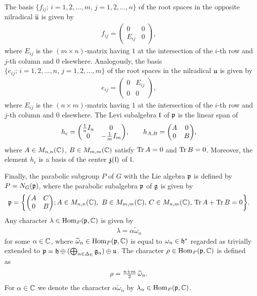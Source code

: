 The basis $\{f_{ij};\, i=1,2,\dots,m,\, j=1,2,\dots,n\}$ of the root spaces in the opposite nilradical $\overline{\mathfrak{u}}$ is given by
\begin{align}
  f_{ij} = \begin{pmatrix}
    0 & 0 \\
    E_{ij} & 0
  \end{pmatrix}\!,
\end{align}
where $E_{ij}$ is the $(m \times n)$-matrix having $1$ at the intersection of the $i$-th row and $j$-th column and $0$ elsewhere. Analogously, the basis $\{e_{ij};\, i=1,2,\dots,n,\, j=1,2,\dots,m\}$ of the root spaces in the nilradical $\mathfrak{u}$ is given by
\begin{align}
  e_{ij} = \begin{pmatrix}
    0 & E_{ij} \\
    0 & 0
  \end{pmatrix}\!,
\end{align}
where $E_{ij}$ is the $(n \times m)$-matrix having $1$ at the intersection of the $i$-th row and $j$-th column and $0$ elsewhere. The Levi subalgebra $\mathfrak{l}$ of $\mathfrak{p}$ is the linear span of
\begin{align}
  h_c = \begin{pmatrix}
    {1 \over n} I_n & 0 \\
    0 & -{1 \over m} I_m
  \end{pmatrix}\!, \qquad
  h_{A,B} = \begin{pmatrix}
    A & 0 \\
    0 & B
  \end{pmatrix}\!,
\end{align}
where $A \in M_{n,n}(\mathbb{C})$, $B \in M_{m,m}(\mathbb{C})$ satisfy $\operatorname{\mathrm{Tr}} A=0$ and $\operatorname{\mathrm{Tr}} B=0$. Moreover,
the element $h_c$ is a basis of the center $\mathfrak{z}(\mathfrak{l})$ of $\mathfrak{l}$.

Finally, the parabolic subgroup $P$ of $G$ with the Lie algebra $\mathfrak{p}$ is defined by $P=N_G(\mathfrak{p})$, where the parabolic subalgebra $\mathfrak{p}$ of $\mathfrak{g}$ is given by
\begin{align}
  \mathfrak{p}=\left\{\begin{pmatrix}
    A & C \\
    0 & B
  \end{pmatrix}\!;
   A \in M_{n,n}(\mathbb{C}),\ B \in M_{m,m}(\mathbb{C}),\, C \in M_{n,m}(\mathbb{C}),\, \operatorname{\mathrm{Tr}} A + \operatorname{\mathrm{Tr}} B =0
  \right\}\!.
\end{align}
Any character $\lambda \in \mathrm{Hom}_P(\mathfrak{p},\mathbb{C})$ is given by
\begin{align}
  \lambda= \alpha \widetilde{\omega}_n
\end{align}
for some $\alpha \in \mathbb{C}$, where $\widetilde{\omega}_n\in \mathrm{Hom}_P(\mathfrak{p},\mathbb{C})$
is equal to $\omega_n\in \mathfrak{h}^*$ regarded as trivially extended to
$\mathfrak{p} =\mathfrak{h} \oplus (\bigoplus_{\alpha \in \Delta_\Sigma} \mathfrak{g}_\alpha) \oplus \mathfrak{u}$.
The character $\rho \in \mathrm{Hom}_P(\mathfrak{p},\mathbb{C})$  is defined as
\begin{align}
  \rho={\textstyle {n+m \over 2}}\,\widetilde{\omega}_n.
\end{align}
For $\alpha \in \mathbb{C}$ we denote the character $\alpha \widetilde{\omega}_n$ by $\lambda_\alpha \in \mathrm{Hom}_P(\mathfrak{p},\mathbb{C})$.
\medskip

